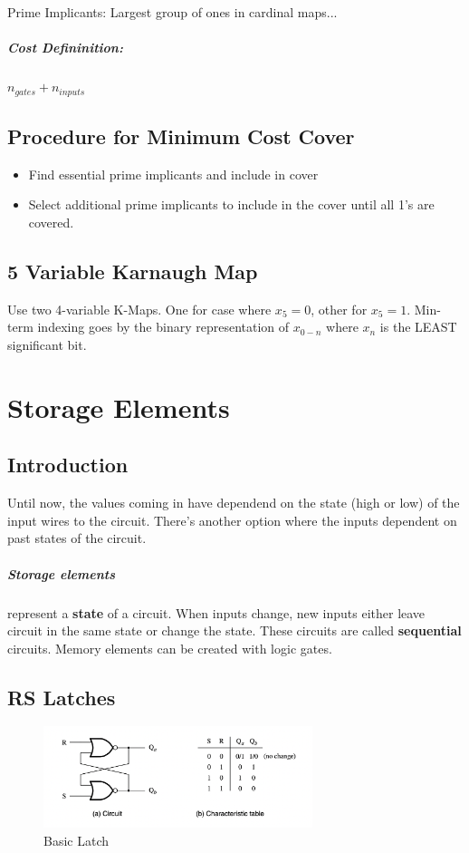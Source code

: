 \documentclass[a4paper,12pt]{report}
\begin{document}
Prime Implicants: Largest group of ones in cardinal maps...

\paragraph{Cost Defininition: } $n_{gates} + n_{inputs}$

\section{Procedure for Minimum Cost Cover}
\begin{itemize}
\item Find essential prime implicants and include in cover
\item Select additional prime implicants to include in the cover until all 1's are covered.
\end{itemize}

\section{5 Variable Karnaugh Map}
Use two 4-variable K-Maps. One for case where $x_5 = 0$, other for $x_5 = 1$.
Min-term indexing goes by the binary representation of $x_{0-n}$ where $x_n$ is the LEAST significant bit.


\chapter{Storage Elements}
\section{Introduction}
Until now, the values coming in have dependend on the state (high or low) of the input 
wires to the circuit. There's another option where the inputs dependent on past states 
of the circuit.

\paragraph{Storage elements } represent a \textbf{state} of a circuit. When inputs 
change, new inputs either leave circuit in the same state or change the state. These 
circuits are called \textbf{sequential} circuits. Memory elements can be created 
with logic gates. 

\section{RS Latches}
\begin{figure}[h]
\centering
\includegraphics[width=0.7\textwidth]{../media/basicLatch.png}
\caption{Basic Latch}
\label{latch-basic}
\end{figure}
\end{document}
